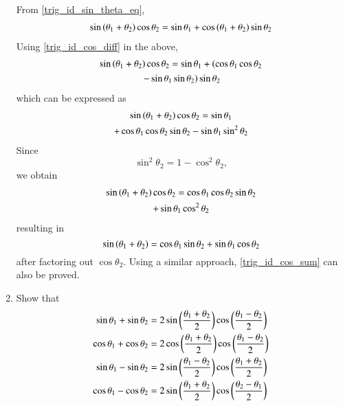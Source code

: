 \begin{enumerate}[label=\arabic*.,ref=\thesubsection.\theenumi]
%
\solution From \eqref{trig_id_sin_theta_eq},
%
\begin{align}
 \sin \left(\theta_1 + \theta_2\right)\cos \theta_2 =\sin  \theta_1 +\cos\left(\theta_1+\theta_2\right)\sin\theta_2 
\end{align}
%
Using \eqref{trig_id_cos_diff} in the above,
%
\begin{multline}
\sin \left(\theta_1 + \theta_2\right)\cos \theta_2 
=\sin  \theta_1 +\left(\cos \theta_1\cos\theta_2 \right.
\\	
\left.	- \sin \theta_1\sin\theta_2\right)\sin\theta_2 
\end{multline}
%
which can be expressed as
%
\begin{multline}
\sin \left(\theta_1 + \theta_2\right)\cos \theta_2 
=\sin  \theta_1 
\\
+\cos \theta_1\cos\theta_2 \sin\theta_2 
		- \sin \theta_1\sin^2\theta_2
\end{multline}
%
Since
%
\begin{equation}
\sin^2\theta_2 = 1- \cos^2\theta_2, 
\end{equation}
%
we obtain
%
\begin{multline}
\sin \left(\theta_1 + \theta_2\right)\cos \theta_2 
=\cos \theta_1\cos\theta_2 \sin\theta_2 
\\	
+ \sin \theta_1\cos^2\theta_2
\end{multline}
%
resulting in
%
\begin{equation}
\sin \left(\theta_1 + \theta_2\right)
=\cos \theta_1 \sin\theta_2 
+ \sin \theta_1\cos\theta_2
\end{equation}
%
after factoring out $\cos \theta_2$.  Using a similar approach, \eqref{trig_id_cos_sum} can also be proved.
%
\item Show that 
\begin{align}
\label{eq:trig_id_sum_diff1}
\sin \theta_1 + \sin \theta_2 &= 2\sin\left(\frac{\theta_1+\theta_2}{2}\right)\cos\left(\frac{\theta_1-\theta_2}{2}\right)
\\
\label{eq:trig_id_sum_diff2}
\cos \theta_1 + \cos \theta_2 &= 2\cos\left(\frac{\theta_1+\theta_2}{2}\right)\cos\left(\frac{\theta_1-\theta_2}{2}\right)
\\
\label{eq:trig_id_sum_diff3}
\sin \theta_1 - \sin \theta_2 &= 2\sin\left(\frac{\theta_1-\theta_2}{2}\right)\cos\left(\frac{\theta_1+\theta_2}{2}\right)
\\
\label{eq:trig_id_sum_diff4}
\cos \theta_1 - \cos \theta_2 &= 2\sin\left(\frac{\theta_1+\theta_2}{2}\right)\cos\left(\frac{\theta_2-\theta_1}{2}\right)
\end{align}
%
\\

\end{enumerate}
